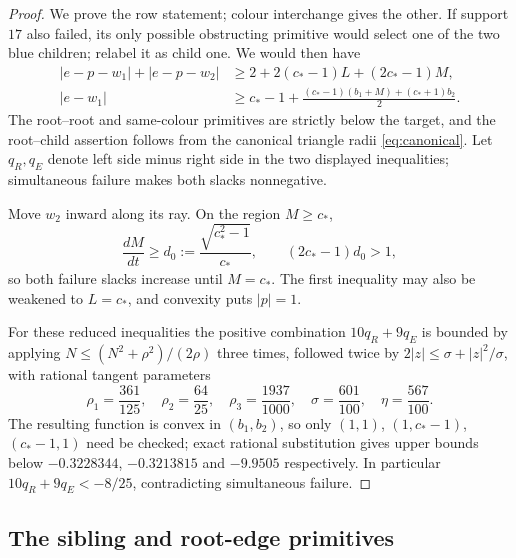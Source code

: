 \documentclass[11pt]{article}
\theoremstyle{plain}
\theoremstyle{definition}
\theoremstyle{remark}
\newcommand{\cstar}{c_{\!*}}
\begin{document}
\begin{proof}
We prove the row statement; colour interchange gives the other.  If support
$17$ also failed, its only possible obstructing primitive would select one
of the two blue children; relabel it as child one.  We would then have
\begin{align*}
 |e-p-w_1|+|e-p-w_2|&\ge2+2(\cstar-1)L+(2\cstar-1)M,\\
 |e-w_1|&\ge\cstar-1+\frac{(\cstar-1)(b_1+M)+(\cstar+1)b_2}{2}.
\end{align*}
The root--root and same-colour primitives are strictly below the target,
and the root--child assertion follows from the canonical triangle radii
\eqref{eq:canonical}.  Let $q_R,q_E$ denote left side minus right side in
the two displayed inequalities; simultaneous failure makes both slacks
nonnegative.

Move $w_2$ inward along its ray.  On the region $M\ge\cstar$,
\[
 \frac{dM}{dt}\ge d_0:=\frac{\sqrt{\cstar^2-1}}{\cstar},
 \qquad (2\cstar-1)d_0>1,
\]
so both failure slacks increase until $M=\cstar$.  The first inequality may
also be weakened to $L=\cstar$, and convexity puts $|p|=1$.

For these reduced inequalities the positive combination $10q_R+9q_E$ is
bounded by applying $N\le(N^2+\rho^2)/(2\rho)$ three times, followed twice
by $2|z|\le\sigma+|z|^2/\sigma$, with rational tangent parameters
\[
 \rho_1=\frac{361}{125},\quad \rho_2=\frac{64}{25},\quad
 \rho_3=\frac{1937}{1000},\quad \sigma=\frac{601}{100},\quad
 \eta=\frac{567}{100}.
\]
The resulting function is convex in $(b_1,b_2)$, so only
$(1,1)$, $(1,\cstar-1)$, $(\cstar-1,1)$ need be checked; exact rational
substitution gives upper bounds below $-0.3228344$, $-0.3213815$ and
$-9.9505$ respectively.  In particular $10q_R+9q_E<-8/25$, contradicting
simultaneous failure.
\end{proof}

\subsection{The sibling and root-edge primitives}
\end{document}
